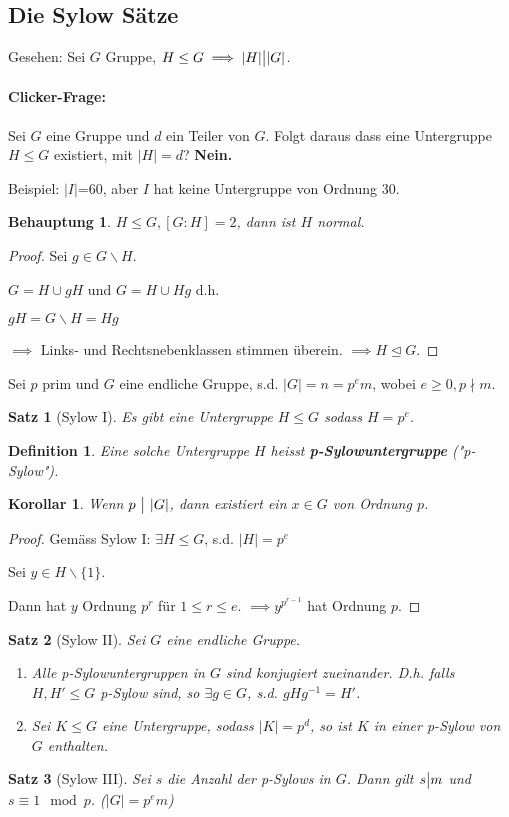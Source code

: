 \documentclass{article}
\theoremstyle{plain}
\newtheorem{definition}{Definition}
\newtheorem{theorem}{Satz}
\newtheorem{corollary}{Korollar}
\newtheorem{behauptung}{Behauptung}
\newcommand{\defn}[1]{\textbf{#1}}
\newcommand{\ug}{\leq}
\newcommand{\normal}{\trianglelefteq}
\newcommand{\teilt}{\big{|}}
\begin{document}
\subsection*{Die Sylow Sätze}
Gesehen: Sei $G$ Gruppe, $H\ug G \implies |H|\teilt|G|$.

\paragraph{Clicker-Frage:} Sei $G$ eine Gruppe und $d$ ein Teiler von $G$. Folgt daraus dass eine Untergruppe $H\ug G$ existiert, mit $|H|=d$? \textbf{Nein.}

Beispiel: $|I|$=60, aber $I$ hat keine Untergruppe von Ordnung $30$.
\begin{behauptung}
    $H\ug G, [G:H]=2$, dann ist $H$ normal.
\end{behauptung}
\begin{proof}
    Sei $g\in G\backslash H$.
    
    $G=H\cup gH$ und $G=H\cup Hg$ d.h. 
    
    $gH=G\backslash H=Hg$
    
    $\implies$ Links- und Rechtsnebenklassen stimmen überein.
    $\implies H\normal G$.
\end{proof}

Sei $p$ prim und $G$ eine endliche Gruppe, s.d. $|G|=n=p^em$, wobei $e\geq 0, p\nmid m$.

\begin{theorem}[Sylow I]
    Es gibt eine Untergruppe $H\ug G$ sodass $H=p^e$.
\end{theorem}
\begin{definition}
    Eine solche Untergruppe $H$ heisst \defn{p-Sylowuntergruppe} ("p-Sylow").
\end{definition}
\begin{corollary}
    Wenn $p\ \teilt\ |G|$, dann existiert ein $x\in G$ von Ordnung $p$.
\end{corollary}
\begin{proof}
    Gemäss Sylow I: $\exists H\ug G$, s.d. $|H|=p^e$

    Sei $y\in H\backslash\{1\}$.

    Dann hat $y$ Ordnung $p^r$ für $1\leq r \leq e$. $\implies y^{p^{r-1}}$ hat Ordnung $p$.
\end{proof}

\begin{theorem}[Sylow II]
    Sei $G$ eine endliche Gruppe.
    \begin{enumerate}[label=(\alph*)]
        \item Alle p-Sylowuntergruppen in $G$ sind konjugiert zueinander. D.h. falls $H,H'\ug G$ p-Sylow sind, so $\exists g\in G$, s.d. $gHg^{-1}=H'$.
        \item Sei $K\ug G$ eine Untergruppe, sodass $|K|=p^d$, so ist $K$ in einer p-Sylow von $G$ enthalten.
    \end{enumerate}
\end{theorem}
\begin{theorem}[Sylow III]
    Sei $s$ die Anzahl der p-Sylows in $G$. Dann gilt $s\teilt m$ und $s\equiv 1 \mod p$. ($|G|=p^em$)
\end{theorem}
\end{document}
